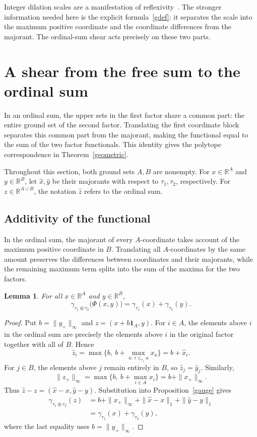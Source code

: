 \documentclass[11pt,reqno]{amsart}
\numberwithin{equation}{section}
\newtheorem{lemma}[theorem]{Lemma}
\theoremstyle{definition}
\theoremstyle{remark}
\theoremstyle{definition}
\begin{document}
Integer dilation scales are a manifestation of reflexivity~\cite[Lemma~1]{BRAUN}. The stronger information needed here is the explicit formula~\eqref{gdef}: it separates the scale into the maximum positive coordinate and the coordinate differences from the majorant. The ordinal-sum shear acts precisely on these two parts.


\section{A shear from the free sum to the ordinal sum}\label{sec:shear}
In an ordinal sum, the upper sets in the first factor share a common part: the entire ground set of the second factor. Translating the first coordinate block separates this common part from the majorant, making the functional equal to the sum of the two factor functionals. This identity gives the polytope correspondence in Theorem~\ref{geometric}.

Throughout this section, both ground sets $A,B$ are nonempty. For $x\in\mathbb R^A$ and $y\in\mathbb R^B$, let $\widehat x,\widehat y$ be their majorants with respect to $\tau_1,\tau_2$, respectively. For $z\in\mathbb R^{A\cup B}$, the notation $\widehat z$ refers to the ordinal sum.

\subsection{Additivity of the functional}
In the ordinal sum, the majorant of every $A$-coordinate takes account of the maximum positive coordinate in $B$. Translating all $A$-coordinates by the same amount preserves the differences between coordinates and their majorants, while the remaining maximum term splits into the sum of the maxima for the two factors.

\begin{lemma}\label{gadd}
For all $x\in\mathbb R^A$ and $y\in\mathbb R^B$,
\begin{equation}\label{addidentity}
 \gamma_{\tau_1\oplus\tau_2}\bigl(\Phi(x,y)\bigr)
       =\gamma_{\tau_1}(x)+\gamma_{\tau_2}(y).
\end{equation}
\end{lemma}
\begin{proof}
Put $b=\|y_+\|_\infty$ and $z=(x+b\mathbf1_A,y)$. For $i\in A$, the elements above $i$ in the ordinal sum are precisely the elements above $i$ in the original factor together with all of $B$. Hence
\[
 \widehat z_i
 =\max\bigl\{b,\ b+\max_{a:\,i\le_{\tau_1}a}x_a\bigr\}
 =b+\widehat x_i.
\]
For $j\in B$, the elements above $j$ remain entirely in $B$, so $\widehat z_j=\widehat y_j$. Similarly,
\[
 \|z_+\|_\infty
 =\max\bigl\{b,\ b+\max_{i\in A}x_i\bigr\}
 =b+\|x_+\|_\infty.
\]
Thus $\widehat z-z=(\widehat x-x,\widehat y-y)$. Substitution into Proposition~\ref{gauge} gives
\begin{align*}
 \gamma_{\tau_1\oplus\tau_2}(z)
 &=b+\|x_+\|_\infty
       +\|\widehat x-x\|_1+\|\widehat y-y\|_1\\
 &=\gamma_{\tau_1}(x)+\gamma_{\tau_2}(y),
\end{align*}
where the last equality uses $b=\|y_+\|_\infty$.
\end{proof}
\end{document}
